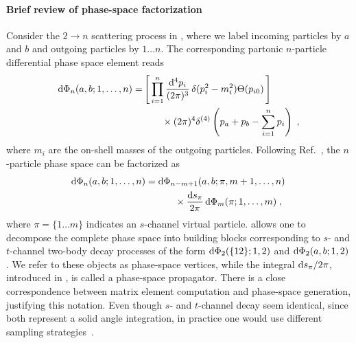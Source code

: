 \paragraph{Brief review of phase-space factorization}
Consider the $2\to n$ scattering process in , 
where we label incoming particles by $a$ and $b$ and outgoing particles by 
$1\ldots n$.  The corresponding partonic $n$-particle differential phase 
space element reads
\begin{equation}
  \begin{split}
  {\rm d}\Phi_n(a,b;1,\ldots,n)=&
    \left[\,\prod\limits_{i=1}^n\frac{{\rm d}^4 p_i}{(2\pi)^3}\,
    \delta(p_i^2-m_i^2)\Theta(p_{i0})\,\right]\,\\
    &\qquad\times(2\pi)^4\delta^{(4)}\left(p_a+p_b-\sum_{i=1}^n p_i\right)\;,
  \end{split}
\end{equation}
where $m_i$ are the on-shell masses of the outgoing particles.  Following 
Ref.~\cite{James:1968gu}, the $n$-particle phase space can be factorized as
\begin{equation}\label{eq:split_ps}
  \begin{split}
  {\rm d}\Phi_n(a,b;1,\ldots,n)=&\;
    {\rm d}\Phi_{n-m+1}(a,b;\pi,m+1,\ldots,n)\,\\
    &\qquad\times \frac{{\rm d} s_\pi}{2\pi}\,
    {\rm d}\Phi_m(\pi;1,\ldots,m)\;,
  \end{split}
\end{equation}
where $\pi=\{1\ldots m\}$ indicates an $s$-channel virtual particle.
 allows one to decompose 
the complete phase space into building blocks corresponding to
$s$- and $t$-channel two-body decay processes of the form 
${\rm d}\Phi_{2}(\{12\};1,2)$ and ${\rm d}\Phi_{2}(a,b;1,2)$.
We refer to these objects as phase-space 
vertices, while the integral ${\rm d} s_\pi/2\pi$, introduced in 
, is called a phase-space propagator. 
There is a close correspondence between matrix element computation and 
phase-space generation, justifying this notation.
Even though $s$- and $t$-channel decay seem identical, since 
both represent a solid angle integration, in practice one would use 
different sampling strategies~\cite{Byckling:1969sx}. 

